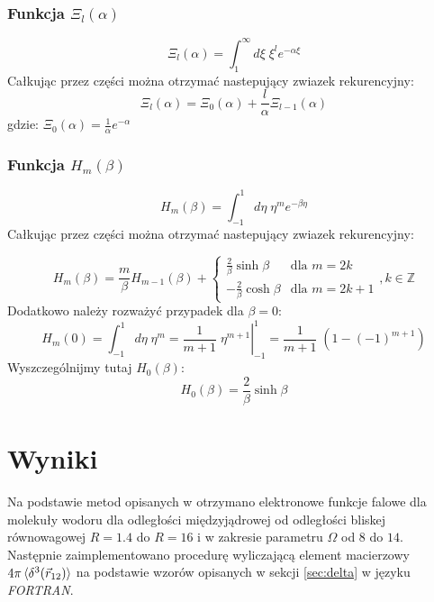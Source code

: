 \documentclass[a4paper,12pt]{article}
\numberwithin{equation}{section}
\numberwithin{table}{section}
\numberwithin{figure}{section}
\begin{document}
\subsubsection{Funkcja $\Xi_l(\alpha)$}

\begin{equation}
\Xi_l(\alpha)= \int_1^\infty d\xi \; \xi^l e^{-\alpha \xi}
\end{equation}
Całkując przez części można otrzymać nastepujący zwiazek rekurencyjny:
\begin{equation}
\Xi_l(\alpha)=\Xi_0(\alpha) + \frac{l}{\alpha}\Xi_{l-1}(\alpha)
\end{equation}
gdzie: $\Xi_0(\alpha)=\frac{1}{\alpha}e^{-\alpha}$

\subsubsection{Funkcja $H_m(\beta)$}
\begin{equation}
H_m(\beta)=\int_{-1}^1 d\eta \; \eta^m e^{-\beta \eta}
\end{equation}
Całkując przez części można otrzymać nastepujący zwiazek rekurencyjny:

\begin{equation}
H_m(\beta)= \frac{m}{\beta}H_{m-1}(\beta) + \begin{cases}\frac{2}{\beta}\sinh \beta& \text{dla  $m=2k$}\\-\frac{2}{\beta}\cosh \beta& \text{dla $m=2k+1$}
\end{cases}, k \in \mathbb{Z}
\end{equation}
Dodatkowo należy rozważyć przypadek dla $\beta=0$:
\begin{equation}
H_m(0)=\int_{-1}^1 d\eta \; \eta^m = \left.\frac{1}{m+1} \; \eta^{m+1}\right|_{-1}^{1}= \frac{1}{m+1}\;(1-(-1)^{m+1})
\end{equation}
Wyszczególnijmy tutaj $H_0(\beta)$:
\begin{equation}
H_0(\beta) = \frac{2}{\beta} \sinh \beta
\end{equation}
%
%
\newpage
\section{Wyniki}
Na podstawie metod opisanych w \cite{pachucki2010,pachucki2012,pachucki2013,pachucki2013a} otrzymano elektronowe funkcje falowe dla molekuły wodoru dla odległości międzyjądrowej od odległości bliskej równowagowej \mbox{$R = 1.4$} do $R = 16$ i w zakresie parametru $\Omega$ od $8$ do $14$. Następnie zaimplementowano procedurę wyliczającą element macierzowy $4\pi\braket{\delta^3(\vec{r}_{12})}$ na podstawie wzorów opisanych w sekcji \ref{sec:delta} w języku \emph{FORTRAN}.
\end{document}
